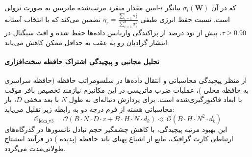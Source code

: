 
که در آن $\sigma_i(\mathbf{W})$ بیانگر $i$-امین مقدار منفرد مرتب‌شده ماتریس به صورت نزولی است. نسبت حفظ انرژی طیفی $\eta_r = \frac{\sum_{i=1}^r \sigma_i^2}{\sum_{i=1}^{d} \sigma_i^2}$ تضمین می‌کند که با انتخاب آستانه $\tau \ge 0.90$، بیش از نود درصد از پراکندگی واریانس داده‌ها حفظ شده و افت سیگنال در انتشار گرادیان رو به عقب به حداقل ممکن کاهش می‌یابد.

\paragraph{تحلیل مجانبی و پیچیدگی اشتراک حافظه سخت‌افزاری}
از منظر پیچیدگی محاسباتی و انتقال داده‌ها در سلسومراتب حافظه (حافظه سراسری  به حافظه محلی )، عملیات ضرب ماتریسی در این مکانیزم نیازمند تخصیص بافر موقت با ابعاد فاکتورگیری‌شده است. برای پردازش دنباله‌ای به طول $N$ با بعد مخفی $D$، بار محاسباتی هسته از فرم درجه دو به رابطه زیر تقلیل می‌یابد:
\begin{equation}
\label{eq:complexity_leka_v3}
\mathcal{C}_{\text{leka\_v3}} = \mathcal{O}\left( B \cdot N \cdot D \cdot r + B \cdot H \cdot N \cdot d_k \right) \ll \mathcal{O}\left( B \cdot H \cdot N^2 \cdot d_k \right)
\end{equation}
این بهبود مرتبه پیچیدگی، با کاهش چشمگیر حجم تبادل تانسورها در گذرگاه‌های ارتباطی کارت گرافیک، مانع از اشباع پهنای باند حافظه (پدیده ) در فرآیند استنتاج طولانی‌مدت می‌گردد.